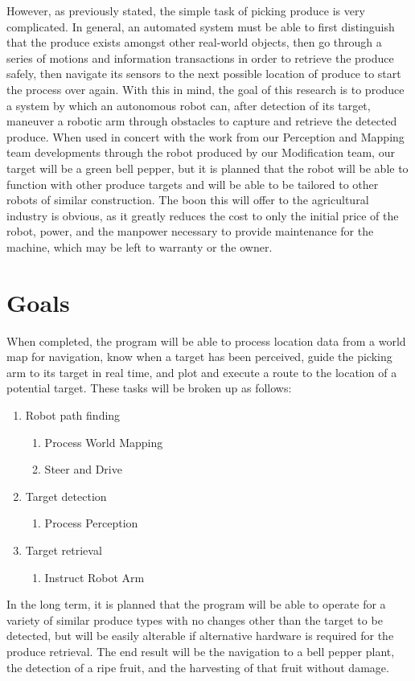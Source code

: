\documentclass[titlepage]{article}
\begin{document}
However, as previously stated, the simple task of picking produce is very complicated. In general, an automated system must be able to first distinguish that the produce exists amongst other real-world objects, then go through a series of motions and information transactions in order to retrieve the produce safely, then navigate its sensors to the next possible location of produce to start the process over again.
With this in mind, the goal of this research is to produce a system by which an autonomous robot can, after detection of its target, maneuver a robotic arm through obstacles to capture and retrieve the detected produce. When used in concert with the work from our Perception and Mapping team developments through the robot produced by our Modification team, our target will be a green bell pepper, but it is planned that the robot will be able to function with other produce targets and will be able to be tailored to other robots of similar construction. The boon this will offer to the agricultural industry is obvious, as it greatly reduces the cost to only the initial price of the robot, power, and the manpower necessary to provide maintenance for the machine, which may be left to warranty or the owner.
\section{Goals}
When completed, the program will be able to process location data from a world map for navigation, know when a target has been perceived, guide the picking arm to its target in real time, and plot and execute a route to the location of a potential target. These tasks will be broken up as follows:
\begin{enumerate}
\item Robot path finding
\begin{enumerate}
\item Process World Mapping
\item Steer and Drive
\end{enumerate}
\item Target detection
\begin{enumerate}
\item Process Perception
\end{enumerate}
\item Target retrieval
\begin{enumerate}
\item Instruct Robot Arm
\end{enumerate}
\end{enumerate}
In the long term, it is planned that the program will be able to operate for a variety of similar produce types with no changes other than the target to be detected, but will be easily alterable if alternative hardware is required for the produce retrieval. The end result will be the navigation to a bell pepper plant, the detection of a ripe fruit, and the harvesting of that fruit without damage.
\end{document}
